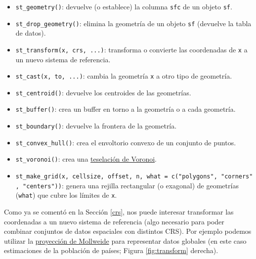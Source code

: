 \documentclass[
]{book}
\providecommand{\tightlist}{%
  \setlength{\itemsep}{0pt}\setlength{\parskip}{0pt}}
\theoremstyle{break}
\theoremstyle{definition}
\theoremstyle{definition}
\theoremstyle{definition}
\theoremstyle{definition}
\theoremstyle{remark}
\begin{document}
\begin{itemize}
\tightlist
\item
  \texttt{st\_geometry()}: devuelve (o establece) la columna \texttt{sfc} de un objeto \texttt{sf}.
\item
  \texttt{st\_drop\_geometry()}: elimina la geometría de un objeto \texttt{sf} (devuelve la tabla de datos).
\item
  \texttt{st\_transform(x,\ crs,\ ...)}: transforma o convierte las coordenadas de \texttt{x} a un nuevo sistema de referencia.
\item
  \texttt{st\_cast(x,\ to,\ ...)}: cambia la geometría \texttt{x} a otro tipo de geometría.
\item
  \texttt{st\_centroid()}: devuelve los centroides de las geometrías.
\item
  \texttt{st\_buffer()}: crea un buffer en torno a la geometría o a cada geometría.
\item
  \texttt{st\_boundary()}: devuelve la frontera de la geometría.
\item
  \texttt{st\_convex\_hull()}: crea el envoltorio convexo de un conjunto de puntos.
\item
  \texttt{st\_voronoi()}: crea una \href{https://en.wikipedia.org/wiki/Voronoi_diagram}{teselación de Voronoi}.
\item
  \texttt{st\_make\_grid(x,\ cellsize,\ offset,\ n,\ what\ =\ c("polygons",\ "corners",\ "centers"))}: genera una rejilla rectangular (o exagonal) de geometrías (\texttt{what}) que cubre los límites de \texttt{x}.
\end{itemize}

Como ya se comentó en la Sección \ref{crs}, nos puede interesar transformar las coordenadas a un nuevo sistema de referencia (algo necesario para poder combinar conjuntos de datos espaciales con distintos CRS).
Por ejemplo podemos utilizar la \href{https://en.wikipedia.org/wiki/Mollweide_projection}{proyección de Mollweide} para representar datos globales (en este caso estimaciones de la población de países; Figura \ref{fig:transform} derecha).
\end{document}
